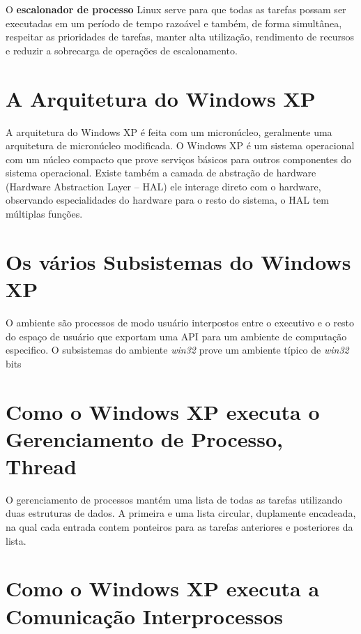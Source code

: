 \documentclass[
	12pt,				%
	oneside,   	        %
	a4paper,			%
	english,			%
	french,				%
	spanish,			%
	brazil,				%
	]{pacotes/abntex2}
\begin{document}
O \textbf{escalonador de processo} Linux serve para que todas as tarefas possam ser executadas em um período de tempo razoável e também, de forma simultânea, respeitar as prioridades de tarefas, manter alta utilização, rendimento de recursos e reduzir a sobrecarga de operações de escalonamento. \cite{processos2-linux}

\section{\textbf{A Arquitetura do Windows XP}}
\label{sec:windows}

A arquitetura do Windows XP é feita com um micronúcleo, geralmente uma arquitetura de micronúcleo modificada. O Windows XP é um sistema operacional com um núcleo compacto que prove serviços básicos para outros componentes do sistema operacional. Existe também a camada de abstração de hardware (Hardware Abstraction Layer – HAL) ele interage direto com o hardware, observando especialidades do hardware para o resto do sistema, o HAL tem múltiplas funções. 

\section{\textbf{Os vários Subsistemas do Windows XP}}
\label{sec:susbsistemas-windows}

O ambiente são processos de modo usuário interpostos entre o executivo e o resto do espaço de usuário que exportam uma API para um ambiente de computação especifico. O subsistemas do ambiente \textit{win32} prove um ambiente típico de \textit{win32} bits

\section{\textbf{Como o Windows XP executa o Gerenciamento de Processo, Thread}}
\label{sec:windows-thread}

O gerenciamento de processos mantém uma lista de todas as tarefas utilizando duas estruturas de dados. A primeira e uma lista circular, duplamente encadeada, na qual cada entrada contem ponteiros para as tarefas anteriores e posteriores da lista.

\section{\textbf{Como o Windows XP executa a Comunicação Interprocessos}}
\label{sec:windows-interprocessos}
\end{document}
